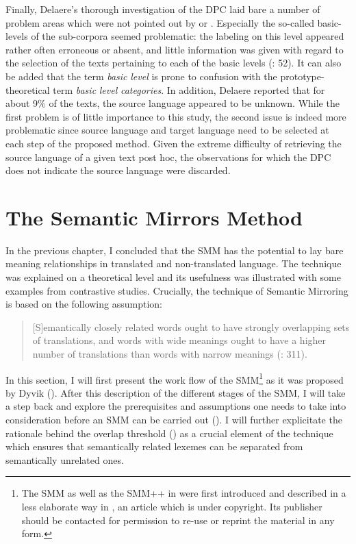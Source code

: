 Finally, Delaere’s thorough investigation of the DPC laid bare a number of problem areas which were not pointed out by \citet{spyns_dutch_2013} or \citet{macken_dutch_2011}. Especially the so-called basic-levels of the sub-corpora seemed problematic: the labeling on this level appeared rather often erroneous or absent, and little information was given with regard to the selection of the texts pertaining to each of the basic levels (\citealt{delaere_translations_2015}: 52). It can also be added that the term \textit{basic} \textit{level} is prone to confusion with the prototype-theoretical term \textit{basic} \textit{level} \textit{categories}. In addition, Delaere reported that for about 9\% of the texts, the source language appeared to be unknown. While the first problem is of little importance to this study, the second issue is indeed more problematic since source language and target language need to be selected at each step of the proposed method. Given the extreme difficulty of retrieving the source language of a given text post hoc, the observations for which the DPC does not indicate the source language were discarded.


\section{\label{sec:3.4}  The Semantic Mirrors Method}

In the previous chapter, I concluded that the SMM has the potential to lay bare meaning relationships in translated and non-translated language. The technique was explained on a theoretical level and its usefulness was illustrated with some examples from contrastive studies. Crucially, the technique of Semantic Mirroring is based on the following assumption:


\begin{quote}
[S]emantically closely related words ought to have strongly overlapping sets of translations, and words with wide meanings ought to have a higher number of translations than words with narrow meanings (\citealt{aijmer_translations_2004}: 311).
\end{quote}


In this section, I will first present the work flow of the SMM\footnote{The SMM as well as the SMM++ in  were first introduced and described in a less elaborate way in \citet{VandevoordeEtAl2017}, an article which is under copyright. Its publisher should be contacted for permission to re-use or reprint the material in any form.} as it was proposed by Dyvik (). After this description of the different stages of the SMM, I will take a step back and explore the prerequisites and assumptions one needs to take into consideration before an SMM can be carried out (). I will further explicitate the rationale behind the overlap threshold () as a crucial element of the technique which ensures that semantically related lexemes can be separated from semantically unrelated ones.


